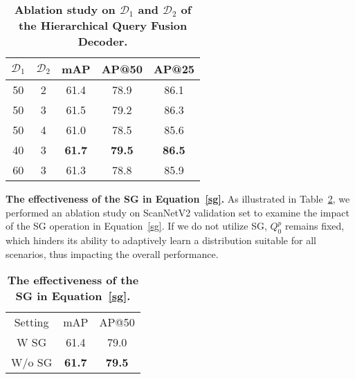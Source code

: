 \begin{table}[!ht]
  \begin{center}
    \footnotesize
    \setlength\tabcolsep{5pt}
    \centering
    \caption{\textbf{Ablation study on $\mathcal{D}_1$ and $\mathcal{D}_2$ of the Hierarchical Query Fusion Decoder.}}
    \label{table:d1d2}
    \begin{tabular}{cc|ccc}
      \toprule
      $\mathcal{D}_1$ & $\mathcal{D}_2$& mAP & AP@50 &AP@25\\
      \midrule
      50 &2&61.4& 78.9&86.1 \\
      50 &3&61.5 &79.2 &86.3 \\
      50 &4&61.0& 78.5&85.6 \\
      40 &3&\textbf{61.7} &\textbf{79.5} &\textbf{86.5} \\
      60 &3&61.3& 78.8&85.9 \\
      \bottomrule
    \end{tabular}
  \end{center}
\end{table}



\textbf{The effectiveness of the SG in Equation~\ref{sg}.} As illustrated in Table~\ref{table:SG}, we performed an ablation study on ScanNetV2 validation set to examine the impact of the SG operation in Equation~\ref{sg}.
%
If we do not utilize SG, $Q^p_0$ remains fixed, which hinders its ability to adaptively learn a distribution suitable for all scenarios, thus impacting the overall performance.
\begin{table}[!ht]
  \begin{center}
    \footnotesize
    \setlength\tabcolsep{5pt}
    \centering
    \caption{\textbf{The effectiveness of the SG in Equation~\ref{sg}.}}
    \label{table:SG}
    \begin{tabular}{c|cc}
      \toprule
      
     Setting&mAP&AP@50\\
      W SG &61.4&79.0\\
      W/o SG &\textbf{61.7}&\textbf{79.5}\\
      \bottomrule 
    \end{tabular}
  \end{center}
\end{table}

